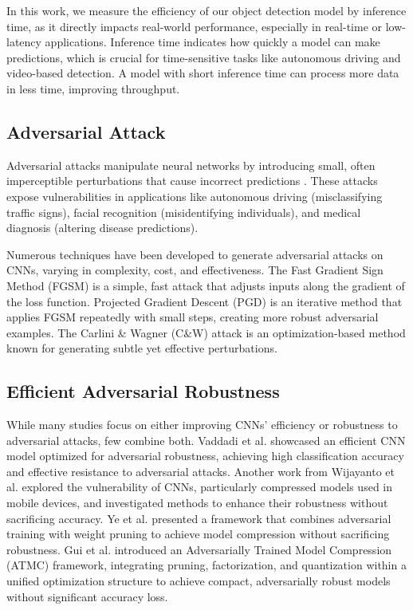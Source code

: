 \documentclass[10pt]{cai}
\begin{document}
In this work, we measure the efficiency of our object detection model by inference time, as it directly impacts real-world performance, especially in real-time or low-latency applications. Inference time indicates how quickly a model can make predictions, which is crucial for time-sensitive tasks like autonomous driving and video-based detection. A model with short inference time can process more data in less time, improving throughput.

\subsection{Adversarial Attack}
Adversarial attacks manipulate neural networks by introducing small, often imperceptible perturbations that cause incorrect predictions \cite{Li_2022}. These attacks expose vulnerabilities in applications like autonomous driving (misclassifying traffic signs), facial recognition (misidentifying individuals), and medical diagnosis (altering disease predictions).

Numerous techniques have been developed to generate adversarial attacks on CNNs, varying in complexity, cost, and effectiveness. The Fast Gradient Sign Method (FGSM) \cite{goodfellow2015explainingharnessingadversarialexamples} is a simple, fast attack that adjusts inputs along the gradient of the loss function. Projected Gradient Descent (PGD) \cite{madry2019deeplearningmodelsresistant} is an iterative method that applies FGSM repeatedly with small steps, creating more robust adversarial examples. The Carlini \& Wagner (C\&W) \cite{carlini2017evaluatingrobustnessneuralnetworks} attack is an optimization-based method known for generating subtle yet effective perturbations.

\subsection{Efficient Adversarial Robustness}
While many studies focus on either improving CNNs' efficiency or robustness to adversarial attacks, few combine both. Vaddadi et al. \cite{EAR1} showcased an efficient CNN model optimized for adversarial robustness, achieving high classification accuracy and effective resistance to adversarial attacks. Another work from Wijayanto et al. \cite{EAR2} explored the vulnerability of CNNs, particularly compressed models used in mobile devices, and investigated methods to enhance their robustness without sacrificing accuracy. Ye et al. \cite{EAR3} presented a framework that combines adversarial training with weight pruning to achieve model compression without sacrificing robustness. Gui et al. \cite{EAR4} introduced an Adversarially Trained Model Compression (ATMC) framework, integrating pruning, factorization, and quantization within a unified optimization structure to achieve compact, adversarially robust models without significant accuracy loss. 
\end{document}
